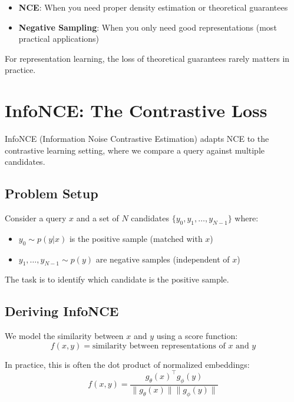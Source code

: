 \begin{notechapter}
\begin{remark}
\leavevmode
\begin{itemize}
    \item \textbf{NCE}: When you need proper density estimation or theoretical guarantees
    \item \textbf{Negative Sampling}: When you only need good representations (most practical applications)
\end{itemize}
For representation learning, the loss of theoretical guarantees rarely matters in practice.
\end{remark}

\section{InfoNCE: The Contrastive Loss}

InfoNCE (Information Noise Contrastive Estimation) adapts NCE to the contrastive learning setting, where we compare a query against multiple candidates.

\subsection{Problem Setup}

Consider a query $x$ and a set of $N$ candidates $\{y_0, y_1, \ldots, y_{N-1}\}$ where:
\begin{itemize}
    \item $y_0 \sim p(y|x)$ is the positive sample (matched with $x$)
    \item $y_1, \ldots, y_{N-1} \sim p(y)$ are negative samples (independent of $x$)
\end{itemize}

The task is to identify which candidate is the positive sample.

\subsection{Deriving InfoNCE}

We model the similarity between $x$ and $y$ using a score function:
\begin{equation}
f(x, y) = \text{similarity between representations of } x \text{ and } y
\end{equation}

In practice, this is often the dot product of normalized embeddings:
\begin{equation}
f(x, y) = \frac{g_\theta(x)^\top g_\phi(y)}{\|g_\theta(x)\| \|g_\phi(y)\|}
\end{equation}


\end{notechapter}
